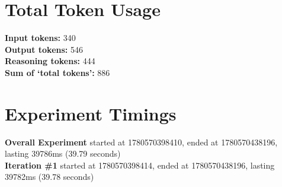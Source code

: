 \documentclass{article}
\begin{document}
\section*{Total Token Usage}
\textbf{Input tokens: }340
\\\textbf{Output tokens: }546
\\\textbf{Reasoning tokens: }444
\\\textbf{Sum of `total tokens': }886
\section*{Experiment Timings}
\textbf{Overall Experiment} started at 1780570398410, ended at 1780570438196, lasting 39786ms (39.79 seconds)
\\\textbf{Iteration \#1} started at 1780570398414, ended at 1780570438196, lasting 39782ms (39.78 seconds)
\end{document}
